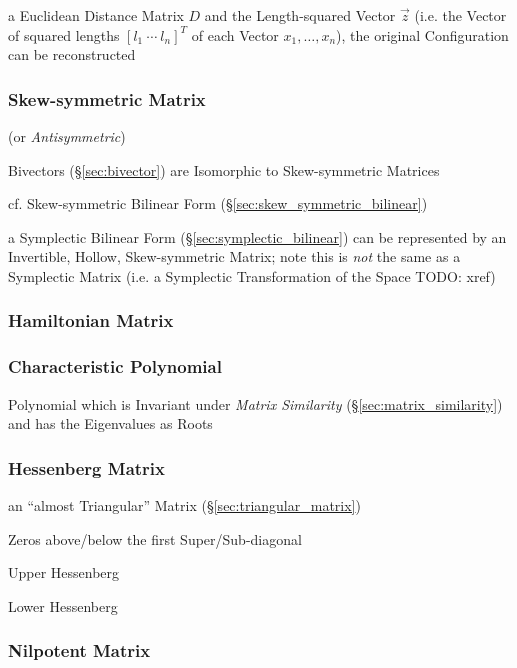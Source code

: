 a Euclidean Distance Matrix $D$ and the Length-squared Vector $\vec{z}$ (i.e.
the Vector of squared lengths $[l_1 \ \cdots \ l_n]^T$ of each Vector $x_1,
\ldots, x_n$), the original Configuration can be reconstructed



\subsubsection{Skew-symmetric Matrix}\label{sec:skew_symmetric_matrix}

(or \emph{Antisymmetric})

Bivectors (\S\ref{sec:bivector}) are Isomorphic to Skew-symmetric Matrices

\fist cf. Skew-symmetric Bilinear Form (\S\ref{sec:skew_symmetric_bilinear})

a Symplectic Bilinear Form (\S\ref{sec:symplectic_bilinear}) can be represented
by an Invertible, Hollow, Skew-symmetric Matrix; note this is \emph{not} the
same as a Symplectic Matrix (i.e. a Symplectic Transformation of the Space
TODO: xref)



\subsubsection{Hamiltonian Matrix}\label{sec:hamiltonian_matrix}

\subsubsection{Characteristic Polynomial}\label{sec:characteristic_polynomial}

Polynomial which is Invariant under \emph{Matrix Similarity}
(\S\ref{sec:matrix_similarity}) and has the Eigenvalues as Roots



\subsubsection{Hessenberg Matrix}\label{sec:hessenberg_matrix}

an ``almost Triangular'' Matrix (\S\ref{sec:triangular_matrix})

Zeros above/below the first Super/Sub-diagonal

Upper Hessenberg

Lower Hessenberg



\subsubsection{Nilpotent Matrix}\label{sec:nilpotent_matrix}

